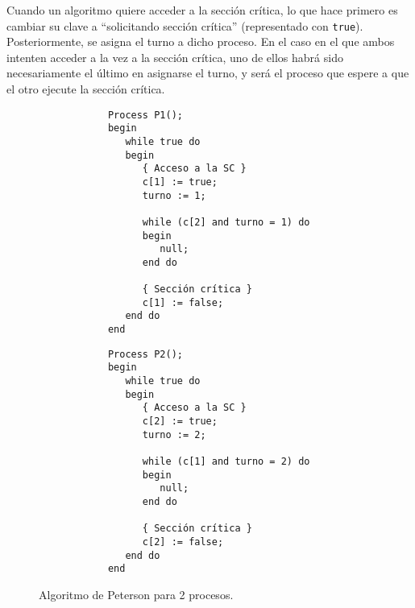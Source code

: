 Cuando un algoritmo quiere acceder a la sección crítica, lo que hace primero es cambiar su clave a ``solicitando sección crítica'' (representado con \verb|true|). Posteriormente, se asigna el turno a dicho proceso. En el caso en el que ambos intenten acceder a la vez a la sección crítica, uno de ellos habrá sido necesariamente el último en asignarse el turno, y será el proceso que espere a que el otro ejecute la sección crítica.

\begin{figure}[H]
    \centering
    \setlength{\columnsep}{1cm}
    \begin{multicols}{2}
        \begin{verbatim}
            Process P1();
            begin
               while true do
               begin
                  { Acceso a la SC }
                  c[1] := true;
                  turno := 1;

                  while (c[2] and turno = 1) do
                  begin
                     null;
                  end do

                  { Sección crítica }
                  c[1] := false;
               end do
            end
        \end{verbatim}
        \begin{verbatim}
            Process P2();
            begin
               while true do
               begin
                  { Acceso a la SC }
                  c[2] := true;
                  turno := 2;

                  while (c[1] and turno = 2) do
                  begin
                     null;
                  end do

                  { Sección crítica }
                  c[2] := false;
               end do
            end
        \end{verbatim}
    \end{multicols}
    \caption{Algoritmo de Peterson para 2 procesos.}
\end{figure}


